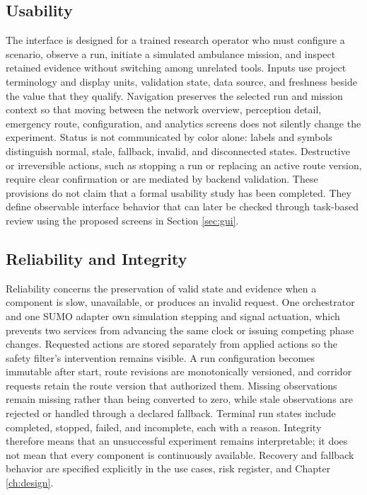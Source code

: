 \subsection{Usability}

The interface is designed for a trained research operator who must configure a scenario, observe a run, initiate a simulated ambulance mission, and inspect retained evidence without switching among unrelated tools. Inputs use project terminology and display units, validation state, data source, and freshness beside the value that they qualify. Navigation preserves the selected run and mission context so that moving between the network overview, perception detail, emergency route, configuration, and analytics screens does not silently change the experiment. Status is not communicated by color alone: labels and symbols distinguish normal, stale, fallback, invalid, and disconnected states. Destructive or irreversible actions, such as stopping a run or replacing an active route version, require clear confirmation or are mediated by backend validation. These provisions do not claim that a formal usability study has been completed. They define observable interface behavior that can later be checked through task-based review using the proposed screens in Section \ref{sec:gui}.

\subsection{Reliability and Integrity}

Reliability concerns the preservation of valid state and evidence when a component is slow, unavailable, or produces an invalid request. One orchestrator and one SUMO adapter own simulation stepping and signal actuation, which prevents two services from advancing the same clock or issuing competing phase changes. Requested actions are stored separately from applied actions so the safety filter's intervention remains visible. A run configuration becomes immutable after start, route revisions are monotonically versioned, and corridor requests retain the route version that authorized them. Missing observations remain missing rather than being converted to zero, while stale observations are rejected or handled through a declared fallback. Terminal run states include completed, stopped, failed, and incomplete, each with a reason. Integrity therefore means that an unsuccessful experiment remains interpretable; it does not mean that every component is continuously available. Recovery and fallback behavior are specified explicitly in the use cases, risk register, and Chapter \ref{ch:design}.

